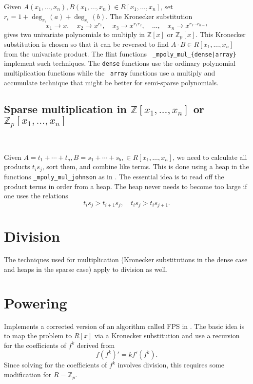 \documentclass[11pt,reqno]{amsart}
\numberwithin{equation}{section}
\newcommand{\op}[1]  { \operatorname{ #1 }}
\newcommand{\bbZ}[0]  { \mathbb{Z}}
\begin{document}
Given $A(x_1,\dots,x_n), B(x_1,\dots,x_n) \in R[x_1,\dots,x_n]$, set $r_i = 1 + 
\op{deg}_{x_i}(a) + \op{deg}_{x_i}(b)$. The Kronecker substitution
\begin{equation*}
x_1 \to x, \quad x_2 \to x^{r_1}, \quad x_3 \to x^{r_1 r_2}, \quad \dots, \quad 
x_n \to x^{r_1 \cdots r_{n-1}}
\end{equation*}
gives two univariate polynomials to multiply in $\bbZ[x]$ or $\bbZ_p[x]$. This 
Kronecker substitution is chosen so that it can be reversed to find $A \cdot B 
\in R[x_1,\dots,x_n]$ from the univariate product. The flint functions {\tt 
\_mpoly\_mul\_\{dense|array\}} implement such techniques. The {\tt dense} 
functions use the ordinary polynomial multiplication functions while the {\tt 
array} functions use a multiply and accumulate technique that might be better 
for semi-sparse polynomials.

\subsection{Sparse multiplication in $\bbZ[x_1,\dots,x_n]$ or 
$\bbZ_p[x_1,\dots,x_n]$}\

Given $A = t_1 + \cdots + t_a, B = s_1 + \cdots + s_b, \in R[x_1,\dots,x_n]$, 
we need to calculate all products $t_i s_j$, sort them, and combine like terms. 
This is done using a heap in the functions {\tt \_mpoly\_mul\_johnson} as in 
\cite{Johnson}. The essential idea is to read off the product terms in order 
from a heap. The heap never needs to become too large if one uses the relations
\begin{equation*}
t_i s_j > t_{i+1} s_j, \quad t_i s_j > t_i s_{j+1}\text{.}
\end{equation*}


\section{Division}

The techniques used for multiplication (Kronecker substitutions in the dense 
case and heaps in the sparse case) apply to division as well.


\section{Powering}

Implements a corrected version of an algorithm called FPS in \cite{FPS}. The 
basic idea is to map the problem to $R[x]$ via a Kronecker substitution and use 
a recursion for the coefficients of $f^k$ derived from
\begin{equation*}
f (f^k)' = k f' (f^k)\text{.}
\end{equation*}
Since solving for the coefficients of $f^k$ involves division, this requires 
some modification for $R=\bbZ_p$.
\end{document}
